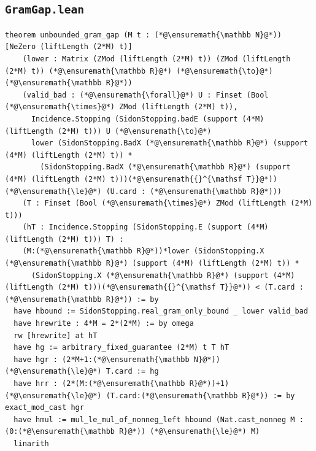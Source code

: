 \subsection*{\texttt{GramGap.lean}}
\begin{lstlisting}
theorem unbounded_gram_gap (M t : (*@\ensuremath{\mathbb N}@*)) [NeZero (liftLength (2*M) t)]
    (lower : Matrix (ZMod (liftLength (2*M) t)) (ZMod (liftLength (2*M) t)) (*@\ensuremath{\mathbb R}@*) (*@\ensuremath{\to}@*) (*@\ensuremath{\mathbb R}@*))
    (valid_bad : (*@\ensuremath{\forall}@*) U : Finset (Bool (*@\ensuremath{\times}@*) ZMod (liftLength (2*M) t)),
      Incidence.Stopping (SidonStopping.badE (support (4*M) (liftLength (2*M) t))) U (*@\ensuremath{\to}@*)
      lower (SidonStopping.BadX (*@\ensuremath{\mathbb R}@*) (support (4*M) (liftLength (2*M) t)) *
        (SidonStopping.BadX (*@\ensuremath{\mathbb R}@*) (support (4*M) (liftLength (2*M) t)))(*@\ensuremath{{}^{\mathsf T}}@*)) (*@\ensuremath{\le}@*) (U.card : (*@\ensuremath{\mathbb R}@*)))
    (T : Finset (Bool (*@\ensuremath{\times}@*) ZMod (liftLength (2*M) t)))
    (hT : Incidence.Stopping (SidonStopping.E (support (4*M) (liftLength (2*M) t))) T) :
    (M:(*@\ensuremath{\mathbb R}@*))*lower (SidonStopping.X (*@\ensuremath{\mathbb R}@*) (support (4*M) (liftLength (2*M) t)) *
      (SidonStopping.X (*@\ensuremath{\mathbb R}@*) (support (4*M) (liftLength (2*M) t)))(*@\ensuremath{{}^{\mathsf T}}@*)) < (T.card : (*@\ensuremath{\mathbb R}@*)) := by
  have hbound := SidonStopping.real_gram_only_bound _ lower valid_bad
  have hrewrite : 4*M = 2*(2*M) := by omega
  rw [hrewrite] at hT
  have hg := arbitrary_fixed_guarantee (2*M) t T hT
  have hgr : (2*M+1:(*@\ensuremath{\mathbb N}@*)) (*@\ensuremath{\le}@*) T.card := hg
  have hrr : (2*(M:(*@\ensuremath{\mathbb R}@*))+1) (*@\ensuremath{\le}@*) (T.card:(*@\ensuremath{\mathbb R}@*)) := by exact_mod_cast hgr
  have hmul := mul_le_mul_of_nonneg_left hbound (Nat.cast_nonneg M : (0:(*@\ensuremath{\mathbb R}@*)) (*@\ensuremath{\le}@*) M)
  linarith
\end{lstlisting}
